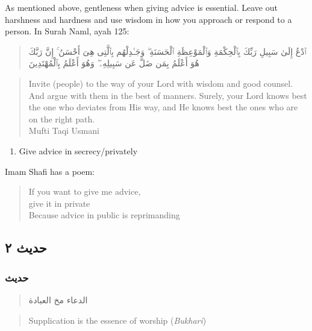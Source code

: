 \documentclass[
]{book}
\providecommand{\tightlist}{%
  \setlength{\itemsep}{0pt}\setlength{\parskip}{0pt}}
\begin{document}
As mentioned above, gentleness when giving advice is essential. Leave out harshness and hardness and use wisdom in how you approach or respond to a person. In Surah Naml, ayah 125:

\begin{quote}
ٱدْعُ إِلَىٰ سَبِيلِ رَبِّكَ بِٱلْحِكْمَةِ وَٱلْمَوْعِظَةِ ٱلْحَسَنَةِ ۖ وَجَـٰدِلْهُم بِٱلَّتِى هِىَ أَحْسَنُ ۚ إِنَّ رَبَّكَ هُوَ أَعْلَمُ بِمَن ضَلَّ عَن سَبِيلِهِۦ ۖ وَهُوَ أَعْلَمُ بِٱلْمُهْتَدِينَ
\end{quote}

\begin{quote}
Invite (people) to the way of your Lord with wisdom and good counsel. And argue with them in the best of manners. Surely, your Lord knows best the one who deviates from His way, and He knows best the ones who are on the right path.\\
Mufti Taqi Usmani
\end{quote}

\begin{enumerate}
\def\labelenumi{\arabic{enumi}.}
\setcounter{enumi}{3}
\tightlist
\item
  Give advice in secrecy/privately
\end{enumerate}

Imam Shafi has a poem:

\begin{quote}
If you want to give me advice,\\
give it in private\\
Because advice in public is reprimanding
\end{quote}

\hypertarget{ux62dux62fux64aux62b-ux662}{%
\subsection{حديث ٢}\label{ux62dux62fux64aux62b-ux662}}

\hypertarget{ux62dux62fux64aux62b-1}{%
\subsubsection{حديث}\label{ux62dux62fux64aux62b-1}}

\begin{quote}
الدعاء مخ العبادة
\end{quote}

\begin{quote}
Supplication is the essence of worship (\emph{Bukhari})
\end{quote}
\end{document}
